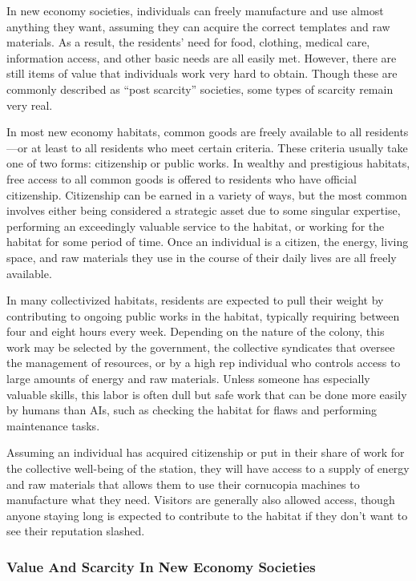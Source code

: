 In new economy societies, individuals can freely 
manufacture and use almost anything they want, assuming they can acquire the correct templates and 
raw materials. As a result, the residents' need for food, 
clothing, medical care, information access, and other 
basic needs are all easily met. However, there are still 
items of value that individuals work very hard to obtain. 
Though these are commonly described as ``post scarcity'' 
societies, some types of scarcity remain very real.

In most new economy habitats, common goods 
are freely available to all residents—or at least to 
all residents who meet certain criteria. These criteria 
usually take one of two forms: citizenship or public 
works. In wealthy and prestigious habitats, free access 
to all common goods is offered to residents who have 
official citizenship. Citizenship can be earned in a 
variety of ways, but the most common involves either 
being considered a strategic asset due to some singular 
expertise, performing an exceedingly valuable service 
to the habitat, or working for the habitat for some 
period of time. Once an individual is a citizen, the 
energy, living space, and raw materials they use in the 
course of their daily lives are all freely available.

In many collectivized habitats, residents are expected to pull their weight by contributing to ongoing public works in the habitat, typically requiring 
between four and eight hours every week. Depending 
on the nature of the colony, this work may be selected 
by the government, the collective syndicates that 
oversee the management of resources, or by a high 
rep individual who controls access to large amounts 
of energy and raw materials. Unless someone has 
especially valuable skills, this labor is often dull but 
safe work that can be done more easily by humans 
than AIs, such as checking the habitat for flaws and 
performing maintenance tasks.

Assuming an individual has acquired citizenship 
or put in their share of work for the collective well-being of the station, they will have access to a supply 
of energy and raw materials that allows them to use 
their cornucopia machines to manufacture what they 
need. Visitors are generally also allowed access, though 
anyone staying long is expected to contribute to the 
habitat if they don't want to see their reputation slashed.

\subsubsection{Value And Scarcity In New Economy Societies}

